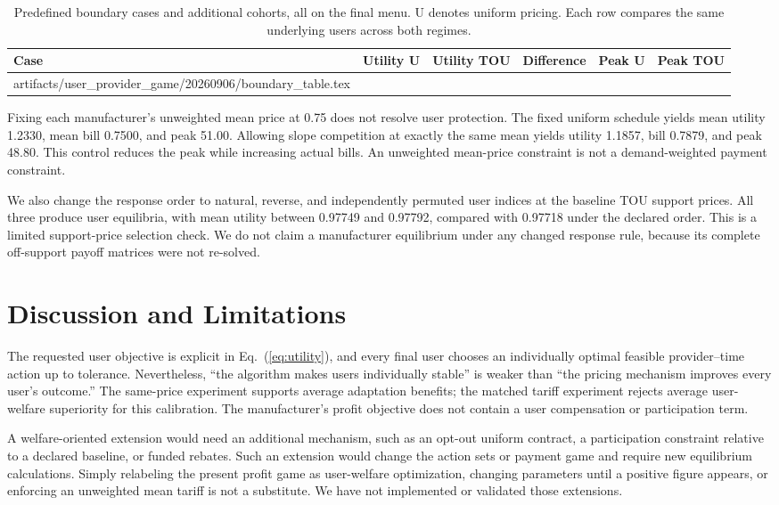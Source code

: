 \documentclass[11pt,a4paper]{article}
\makeatletter
\newcommand{\inputtable}[1]{\@@input #1 }
\makeatother
\begin{document}
\begin{table}[htbp]
\centering
\caption{Predefined boundary cases and additional cohorts, all on the final menu. U denotes uniform pricing. Each row compares the same underlying users across both regimes.}
\label{tab:boundary}
\small
\begin{tabular}{@{}lrrrrr@{}}
\toprule
Case & Utility U & Utility TOU & Difference & Peak U & Peak TOU \\
\midrule
\inputtable{artifacts/user_provider_game/20260906/boundary_table.tex}
\bottomrule
\end{tabular}
\end{table}

Fixing each manufacturer's unweighted mean price at 0.75 does not resolve user protection. The fixed uniform schedule yields mean utility 1.2330, mean bill 0.7500, and peak 51.00. Allowing slope competition at exactly the same mean yields utility 1.1857, bill 0.7879, and peak 48.80. This control reduces the peak while increasing actual bills. An unweighted mean-price constraint is not a demand-weighted payment constraint.

We also change the response order to natural, reverse, and independently permuted user indices at the baseline TOU support prices. All three produce user equilibria, with mean utility between 0.97749 and 0.97792, compared with 0.97718 under the declared order. This is a limited support-price selection check. We do not claim a manufacturer equilibrium under any changed response rule, because its complete off-support payoff matrices were not re-solved.

\FloatBarrier
\section{Discussion and Limitations}
The requested user objective is explicit in Eq.~(\ref{eq:utility}), and every final user chooses an individually optimal feasible provider--time action up to tolerance. Nevertheless, ``the algorithm makes users individually stable'' is weaker than ``the pricing mechanism improves every user's outcome.'' The same-price experiment supports average adaptation benefits; the matched tariff experiment rejects average user-welfare superiority for this calibration. The manufacturer's profit objective does not contain a user compensation or participation term.

A welfare-oriented extension would need an additional mechanism, such as an opt-out uniform contract, a participation constraint relative to a declared baseline, or funded rebates. Such an extension would change the action sets or payment game and require new equilibrium calculations. Simply relabeling the present profit game as user-welfare optimization, changing parameters until a positive figure appears, or enforcing an unweighted mean tariff is not a substitute. We have not implemented or validated those extensions.
\end{document}
